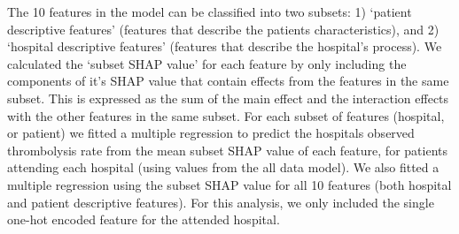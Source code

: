 The 10 features in the model can be classified into two subsets: 1) `patient descriptive features' (features that describe the patients characteristics), and 2) `hospital descriptive features' (features that describe the hospital’s process). We calculated the `subset SHAP value' for each feature by only including the components of it's SHAP value that contain effects from the features in the same subset. This is expressed as the sum of the main effect and the interaction effects with the other features in the same subset. For each subset of features (hospital, or patient) we fitted a multiple regression to predict the hospitals observed thrombolysis rate from the mean subset SHAP value of each feature, for patients attending each hospital (using values from the all data model). We also fitted a multiple regression using the subset SHAP value for all 10 features (both hospital and patient descriptive features). For this analysis, we only included the single one-hot encoded feature for the attended hospital. 


